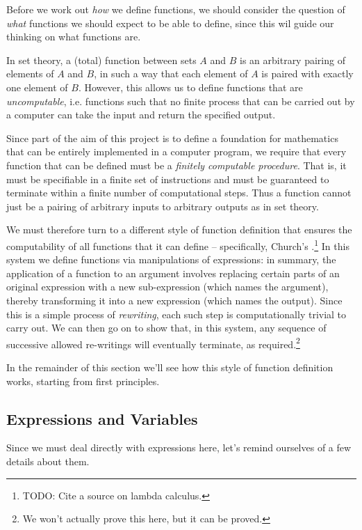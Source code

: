 Before we work out \emph{how} we define functions, we should consider the question of \emph{what} functions we should expect to be able to define, since this wil guide our thinking on what functions are.


In set theory, a (total) function between sets $A$ and $B$ is an arbitrary pairing of elements of $A$ and $B$, in such a way that each element of $A$ is paired with exactly one element of $B$.
However, this allows us to define functions that are \emph{uncomputable}, i.e. functions such that no finite process that can be carried out by a computer can take the input and return the specified output.  

Since part of the aim of this project is to define a foundation for mathematics that can be entirely implemented in a computer program, we require that every function that can be defined must be a \emph{finitely computable procedure}.  That is, it must be specifiable in a finite set of instructions and must be guaranteed to terminate within a finite number of computational steps.
Thus a function cannot just be a pairing of arbitrary inputs to arbitrary outputs as in set theory.  

We must therefore turn to a different style of function definition that ensures the computability of all functions that it can define -- specifically, Church's .\footnote{
TODO: Cite a source on lambda calculus.
}  
In this system we define functions via manipulations of expressions: in summary, the application of a function to an argument involves replacing certain parts of an original expression with a new sub-expression (which names the argument), thereby transforming it into a new expression (which names the output).  Since this is a simple process of \emph{rewriting}, each such step is computationally trivial to carry out.  We can then go on to show that, in this system, any sequence of successive allowed re-writings will eventually terminate, as required.\footnote{
We won't actually prove this here, but it can be proved.
}

In the remainder of this section we'll see how this style of function definition works, starting from first principles.




\subsection{Expressions and Variables}

Since we must deal directly with expressions here, let's remind ourselves of a few details about them.


